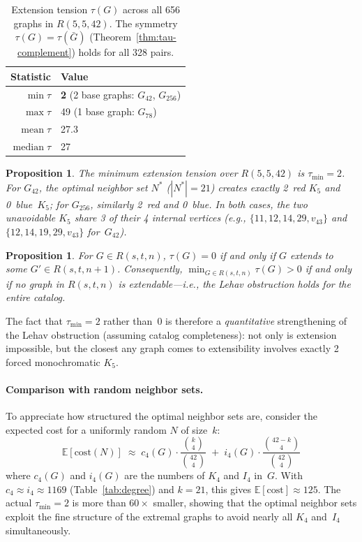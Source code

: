 \documentclass[11pt,a4paper]{article}
\newtheorem{proposition}[theorem]{Proposition}
\theoremstyle{definition}
\theoremstyle{remark}
\newcommand{\Rset}[3]{R(#1,#2,#3)}
\begin{document}
\begin{table}[h]
\centering
\begin{tabular}{rl}
\toprule
\textbf{Statistic} & \textbf{Value} \\
\midrule
$\min \tau$ & \textbf{2}  \quad (2 base graphs: $G_{42}$, $G_{256}$) \\
$\max \tau$ & 49 \quad (1 base graph: $G_{78}$) \\
$\mathrm{mean}\;\tau$ & 27.3 \\
$\mathrm{median}\;\tau$ & 27 \\
\bottomrule
\end{tabular}
\caption{Extension tension $\tau(G)$ across all 656 graphs
in $\Rset{5}{5}{42}$.  The symmetry $\tau(G) = \tau(\bar{G})$
(Theorem~\ref{thm:tau-complement}) holds for all 328 pairs.}
\label{tab:tension}
\end{table}

\begin{proposition}\label{prop:tau2}
The minimum extension tension over $\Rset{5}{5}{42}$ is
$\tau_{\min} = 2$.  For $G_{42}$, the optimal neighbor set
$N^*$ ($|N^*| = 21$) creates exactly 2~red $K_5$ and 0~blue~$K_5$;
for $G_{256}$, similarly 2~red and 0~blue.
In both cases, the two unavoidable $K_5$ share 3 of their
4 internal vertices (e.g., $\{11,12,14,29,v_{43}\}$ and
$\{12,14,19,29,v_{43}\}$ for~$G_{42}$).
\end{proposition}

\begin{proposition}\label{prop:tau-zero}
For $G \in \Rset{s}{t}{n}$, $\tau(G) = 0$ if and only if
$G$ extends to some $G' \in \Rset{s}{t}{n+1}$.
Consequently, $\min_{G \in \Rset{s}{t}{n}} \tau(G) > 0$ if and only
if no graph in $\Rset{s}{t}{n}$ is extendable---i.e., the Lehav
obstruction holds for the entire catalog.
\end{proposition}

The fact that $\tau_{\min} = 2$ rather than~0 is therefore a
\emph{quantitative} strengthening of the Lehav obstruction
(assuming catalog completeness): not only is extension impossible,
but the closest any graph comes to extensibility involves
exactly 2 forced monochromatic $K_5$.

\paragraph{Comparison with random neighbor sets.}
To appreciate how structured the optimal neighbor sets are,
consider the expected cost for a uniformly random $N$ of size~$k$:
\[
  \mathbb{E}[\mathrm{cost}(N)]
  \;\approx\;
  c_4(G) \!\cdot\! \frac{\binom{k}{4}}{\binom{42}{4}}
  \;+\;
  i_4(G) \!\cdot\! \frac{\binom{42-k}{4}}{\binom{42}{4}}
\]
where $c_4(G)$ and $i_4(G)$ are the numbers of $K_4$ and $I_4$
in~$G$.  With $c_4 \approx i_4 \approx 1169$
(Table~\ref{tab:degree}) and $k = 21$, this gives
$\mathbb{E}[\mathrm{cost}] \approx 125$.
The actual $\tau_{\min} = 2$ is more than $60\times$ smaller,
showing that the optimal neighbor sets exploit the
fine structure of the extremal graphs to avoid nearly all
$K_4$ and~$I_4$ simultaneously.
\end{document}
